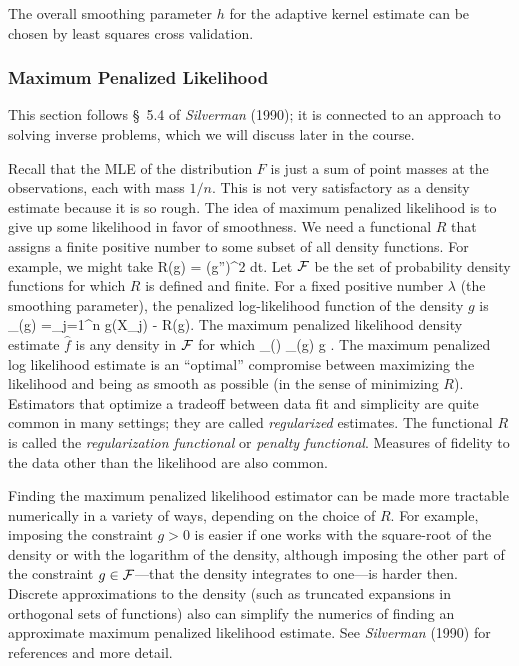The overall smoothing parameter $h$ for the adaptive kernel estimate
can be chosen by least squares cross validation.

\subsubsection{Maximum Penalized Likelihood}
This section follows \S~5.4 of {\em Silverman\/} (1990);
it is connected to an approach to solving
inverse problems, which we will discuss later in the course.

Recall that the MLE of the distribution $F$ is just a sum of point masses
at the observations, each with mass $1/n$.
This is not very satisfactory as a density estimate because it is so rough.
The idea of maximum penalized likelihood is to give up some likelihood in
favor of smoothness.
We need a functional $R$ that assigns a finite positive number to some subset
of all density functions.
For example, we might take
\beq
    R(g) = \int (g'')^2 dt.
\eeq
Let ${\cal F}$ be the set of probability density functions for which $R$ is defined and finite.
For a fixed positive number $\lambda$ (the smoothing parameter),
the penalized log-likelihood function of the density $g$ is
\beq
    \ell_\lambda (g) =\sum_{j=1}^n \log g(X_j) - \lambda R(g).
\eeq
The maximum penalized likelihood density estimate $\hat{f}$ is any density in
${\cal F}$ for which
\beq
    \ell_\lambda() \ge \ell_\lambda(g) \;\; \forall g \in \calF.
\eeq
The maximum penalized log likelihood estimate is an ``optimal'' compromise
between maximizing the likelihood and being as smooth as possible
(in the sense of minimizing
$R$).
Estimators that optimize a tradeoff between data fit and simplicity
are quite common in many settings; they are called
{\em regularized\/} estimates.
The functional $R$ is called the {\em regularization functional\/} or 
{\em penalty functional\/}.
Measures of fidelity to the data other than the likelihood are also common.

Finding the maximum penalized likelihood estimator
can be made more tractable numerically in a variety of ways,
depending on the choice of $R$.
For example, imposing the constraint $g > 0$ is easier if one works with the square-root
of the density or with the logarithm of the density, although imposing the
other part of the constraint $g \in {\cal F}$---that the density integrates to one---is
harder then.
Discrete approximations
to the density (such as truncated expansions in orthogonal sets of functions)
also can simplify the numerics of finding an approximate maximum
penalized likelihood estimate.
See {\em Silverman\/} (1990) for references and more detail.

